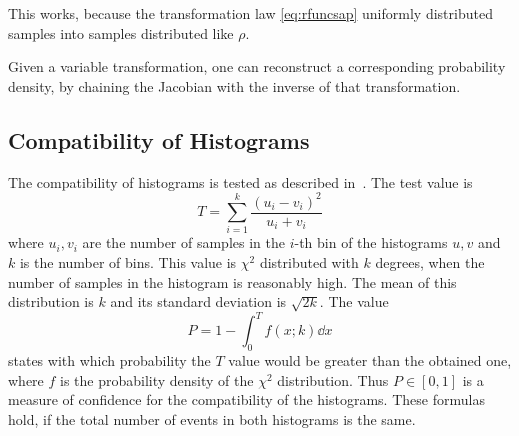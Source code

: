 This works, because the transformation law \cref{eq:rfuncsap}
uniformly distributed samples into samples distributed like \(\rho\).

Given a variable transformation, one can reconstruct a corresponding
probability density, by chaining the Jacobian with the inverse of that
transformation.

\subsection{Compatibility of Histograms}
\label{sec:comphist}

The compatibility of histograms is tested as described
in~\cite{porter2008:te}. The test value
is \[T=\sum_{i=1}^k\frac{(u_i-v_i)^2}{u_i+v_i}\] where \(u_i, v_i\)
are the number of samples in the \(i\)-th bin of the histograms
\(u,v\) and \(k\) is the number of bins. This value is \(\chi^2\)
distributed with \(k\) degrees, when the number of samples in the
histogram is reasonably high. The mean of this distribution is \(k\)
and its standard deviation is \(\sqrt{2k}\). The value
\[P = 1 - \int_0^{T}f(x;k)\dd{x}\] states with which probability the
\(T\) value would be greater than the obtained one, where \(f\) is the
probability density of the \(\chi^2\) distribution. Thus
\(P\in [0,1]\) is a measure of confidence for the compatibility of the
histograms. These formulas hold, if the total number of events in both
histograms is the same.

